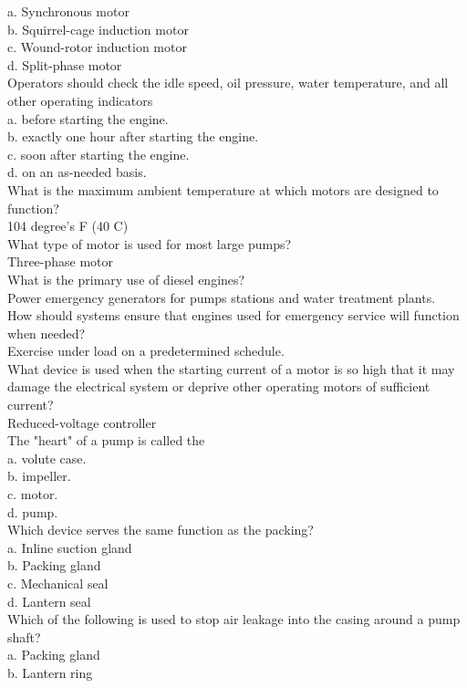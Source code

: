 a.	Synchronous motor\\
b.	Squirrel-cage induction motor\\
c.	Wound-rotor induction motor\\
d.	Split-phase motor\\
Operators should check the idle speed, oil pressure, water temperature, and all other operating indicators\\
a.	before starting the engine.\\
b.	exactly one hour after starting the engine.\\
c.	soon after starting the engine.\\
d.	on an as-needed basis.\\
What is the maximum ambient temperature at which motors are designed to function?\\
104 degree’s F (40 C)\\
What type of motor is used for most large pumps?\\
Three-phase motor\\
What is the primary use of diesel engines?\\
Power emergency generators for pumps stations and water treatment plants.\\
How should systems ensure that engines used for emergency service will function when needed?\\
Exercise under load on a predetermined schedule.\\
What device is used when the starting current of a motor is so high that it may damage the electrical system or deprive other operating motors of sufficient current?\\
Reduced-voltage controller\\
The "heart" of a pump is called the\\
a.	volute case.\\
b.	impeller.\\
c.	motor.\\
d.	pump.\\
Which device serves the same function as the packing?\\
a.	Inline suction gland\\
b.	Packing gland\\
c.	Mechanical seal\\
d.	Lantern seal\\
Which of the following is used to stop air leakage into the casing around a pump shaft?\\
a.	Packing gland\\
b.	Lantern ring\\

